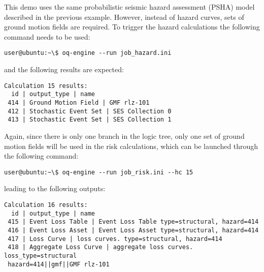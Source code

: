 This demo uses the same probabilistic seismic hazard assessment (PSHA) model
described in the previous example. However, instead of hazard curves, sets of
ground motion fields are required. To trigger the hazard calculations the
following command needs to be used:

\begin{Verbatim}[frame=single, commandchars=\\\{\}, samepage=true]
user@ubuntu:~\$ oq-engine --run job_hazard.ini
\end{Verbatim}

and the following results are expected:

\begin{Verbatim}[frame=single, commandchars=\\\{\}, samepage=true]
Calculation 15 results:
  id | output_type | name
 414 | Ground Motion Field | GMF rlz-101
 412 | Stochastic Event Set | SES Collection 0
 413 | Stochastic Event Set | SES Collection 1
\end{Verbatim}

Again, since there is only one branch in the logic tree, only one set of
ground motion fields will be used in the risk calculations, which can be
launched through the following command:

\begin{Verbatim}[frame=single, commandchars=\\\{\}, samepage=true]
user@ubuntu:~\$ oq-engine --run job_risk.ini --hc 15
\end{Verbatim}

leading to the following outputs:

\begin{Verbatim}[frame=single, commandchars=\\\{\}, samepage=true]
Calculation 16 results:
  id | output_type | name
 415 | Event Loss Table | Event Loss Table type=structural, hazard=414
 416 | Event Loss Asset | Event Loss Asset type=structural, hazard=414
 417 | Loss Curve | loss curves. type=structural, hazard=414
 418 | Aggregate Loss Curve | aggregate loss curves. loss_type=structural 
 hazard=414||gmf||GMF rlz-101
\end{Verbatim}